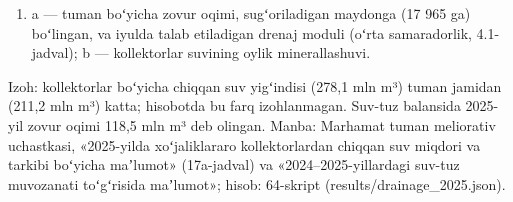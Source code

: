 
\begin{enumerate}
\def\labelenumi{\alph{enumi})}
\setcounter{enumi}{6}
\tightlist
\item
  a --- tuman boʻyicha zovur oqimi, sugʻoriladigan maydonga (17 965 ga)
  boʻlingan, va iyulda talab etiladigan drenaj moduli (oʻrta
  samaradorlik, 4.1-jadval); b --- kollektorlar suvining oylik
  minerallashuvi.
\end{enumerate}

Izoh: kollektorlar boʻyicha chiqqan suv yigʻindisi (278,1 mln m³) tuman
jamidan (211,2 mln m³) katta; hisobotda bu farq izohlanmagan. Suv-tuz
balansida 2025-yil zovur oqimi 118,5 mln m³ deb olingan. Manba: Marhamat
tuman meliorativ uchastkasi, «2025-yilda xoʻjaliklararo kollektorlardan
chiqqan suv miqdori va tarkibi boʻyicha maʼlumot» (17a-jadval) va
«2024--2025-yillardagi suv-tuz muvozanati toʻgʻrisida maʼlumot»; hisob:
64-skript (results/drainage\_2025.json).
